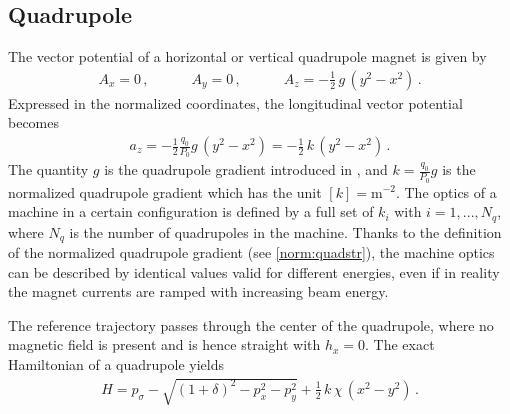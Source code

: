 \subsection{Quadrupole}
%
The vector potential of a horizontal or vertical quadrupole magnet is given by~\cite{CERN-SL-95-12}
\begin{align}
A_x = 0 \, , \quad \quad \quad A_y = 0 \,, \quad \quad \quad A_z = - \frac{1}{2} \, g \, (y^2 -x^2) \, .
\end{align}
%
Expressed in the normalized coordinates, the longitudinal vector potential becomes
%
\begin{align}
a_z = - \frac{1}{2} \frac{q_0}{P_0} g  \, (y^2 -x^2)  = - \frac{1}{2} \, k \,  (y^2 -x^2) \, .
\end{align}
The quantity $g$ is the quadrupole gradient introduced in , and $k=\frac{q_0}{P_0} g$ is the normalized quadrupole gradient which has the unit $[k] = \text{m}^{-2}$. The optics of a machine in a certain configuration is defined by a full set of $k_i$ with $i= 1,...,N_q$, where $N_q$ is the number of quadrupoles in the machine. Thanks to the definition of the normalized quadrupole gradient (see \eqref{norm:quadstr}), the machine optics can be described by identical values valid for different energies, even if in reality the magnet currents are ramped with increasing beam energy. 

The reference trajectory passes through the center of the quadrupole, where no magnetic field is present and is hence straight with $h_x=0$. The exact Hamiltonian of a quadrupole yields 
\begin{align}
H = p_\sigma - \sqrt{(1+\delta)^2 - p_x^2 -p_y^2} + \frac{1}{2} \, k \, \chi\, (x^2 -y^2) \, .
\end{align}


